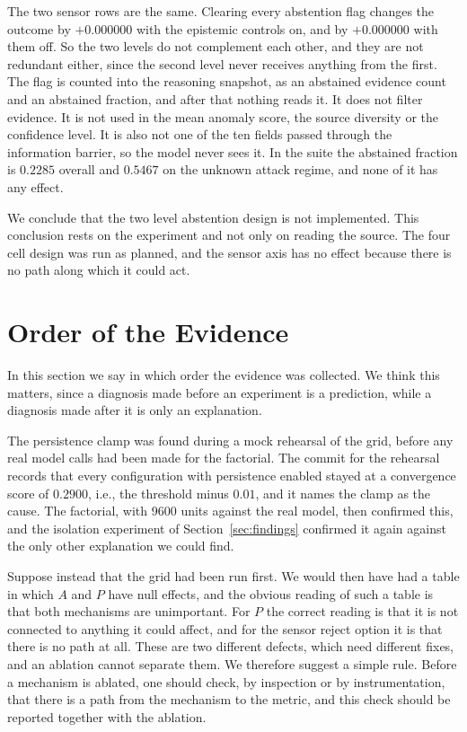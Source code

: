 \documentclass[conference]{IEEEtran}
\begin{document}
The two sensor rows are the same. Clearing every abstention flag changes the
outcome by $+0.000000$ with the epistemic controls on, and by $+0.000000$ with
them off. So the two levels do not complement each other, and they are not
redundant either, since the second level never receives anything from the
first. The flag is counted into the reasoning snapshot, as an abstained
evidence count and an abstained fraction, and after that nothing reads it. It
does not filter evidence. It is not used in the mean anomaly score, the source
diversity or the confidence level. It is also not one of the ten fields passed
through the information barrier, so the model never sees it. In the suite the
abstained fraction is $0.2285$ overall and $0.5467$ on the unknown attack
regime, and none of it has any effect.

We conclude that the two level abstention design is not implemented. This
conclusion rests on the experiment and not only on reading the source. The
four cell design was run as planned, and the sensor axis has no effect because
there is no path along which it could act.

\section{Order of the Evidence}
\label{sec:confirmation}

In this section we say in which order the evidence was collected. We think
this matters, since a diagnosis made before an experiment is a prediction,
while a diagnosis made after it is only an explanation.

The persistence clamp was found during a mock rehearsal of the grid, before
any real model calls had been made for the factorial. The commit for the
rehearsal records that every configuration with persistence enabled stayed at
a convergence score of $0.2900$, i.e., the threshold minus $0.01$, and it names
the clamp as the cause. The factorial, with 9600 units against the real model,
then confirmed this, and the isolation experiment of
Section~\ref{sec:findings} confirmed it again against the only other
explanation we could find.

Suppose instead that the grid had been run first. We would then have had a
table in which $A$ and $P$ have null effects, and the obvious reading of such a
table is that both mechanisms are unimportant. For $P$ the correct reading is
that it is not connected to anything it could affect, and for the sensor
reject option it is that there is no path at all. These are two different
defects, which need different fixes, and an ablation cannot separate them. We
therefore suggest a simple rule. Before a mechanism is ablated, one should
check, by inspection or by instrumentation, that there is a path from the
mechanism to the metric, and this check should be reported together with the
ablation.
\end{document}
